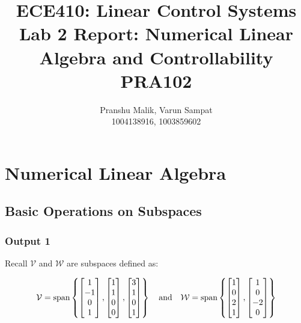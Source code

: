 \documentclass[10pt]{article}
\date{}
\begin{document}
\title{\textbf{\Large{\textsc{ECE410:} Linear Control Systems}} \\ \Large{Lab 2 Report: Numerical Linear Algebra and Controllability} \\ \textbf{\small{PRA102}}\vspace{-0.3cm}}
\author{Pranshu Malik, Varun Sampat \\ \footnotesize{1004138916}, \footnotesize{1003859602}\vspace{-3cm}}

\maketitle

\section{Numerical Linear Algebra}
\subsection{Basic Operations on Subspaces}
\subsubsection{Output 1}
Recall $ \mathcal{V} $ and $ \mathcal{W} $ are subspaces defined as:

\begin{equation*}
    \mathcal{V} = \text{span}
    \begin{Bmatrix}
        \begin{bmatrix} 1\\-1\\0\\1 \end{bmatrix},
        \begin{bmatrix} 1\\1\\0\\0 \end{bmatrix},
        \begin{bmatrix} 3\\1\\0\\1 \end{bmatrix}
    \end{Bmatrix}
    \quad
    \text{and}
    \quad
    \mathcal{W} = \text{span}
    \begin{Bmatrix}
        \begin{bmatrix} 1\\0\\2\\1 \end{bmatrix},
        \begin{bmatrix} 1\\0\\-2\\0 \end{bmatrix}
    \end{Bmatrix}
\end{equation*}
\end{document}
